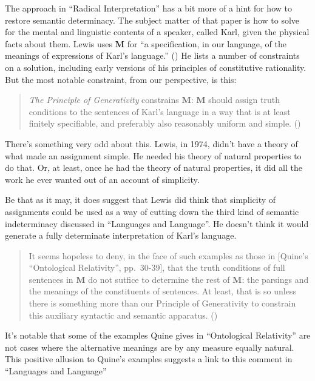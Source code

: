 \documentclass[
  11pt,
  letterpaper,
  DIV=11,
  numbers=noendperiod,
  twoside]{scrartcl}
\begin{document}
The approach in ``Radical Interpretation'' has a bit more of a hint for
how to restore semantic determinacy. The subject matter of that paper is
how to solve for the mental and linguistic contents of a speaker, called
Karl, given the physical facts about them. Lewis uses \textbf{M} for ``a
specification, in our language, of the meanings of expressions of Karl's
language.'' () He lists a
number of constraints on a solution, including early versions of his
principles of constitutive rationality. But the most notable constraint,
from our perspective, is this:

\begin{quote}
\emph{The Principle of Generativity} constrains \textbf{M}: \textbf{M}
should assign truth conditions to the sentences of Karl's language in a
way that is at least finitely specifiable, and preferably also
reasonably uniform and simple. ()
\end{quote}

There's something very odd about this. Lewis, in 1974, didn't have a
theory of what made an assignment simple. He needed his theory of
natural properties to do that. Or, at least, once he had the theory of
natural properties, it did all the work he ever wanted out of an account
of simplicity.

Be that as it may, it does suggest that Lewis did think that simplicity
of assignments could be used as a way of cutting down the third kind of
semantic indeterminacy discussed in ``Languages and Language''. He
doesn't think it would generate a fully determinate interpretation of
Karl's language.

\begin{quote}
It seems hopeless to deny, in the face of such examples as those in
{[}Quine's ``Ontological Relativity'', pp.~30-39{]}, that the truth
conditions of full sentences in \textbf{M} do not sutfice to determine
the rest of \textbf{M}: the parsings and the meanings of the
constituents of sentences. At least, that is so unless there is
something more than our Principle of Generativity to constrain this
auxiliary syntactic and semantic apparatus.
()
\end{quote}

It's notable that some of the examples Quine gives in ``Ontological
Relativity'' are not cases where the alternative meanings are by any
measure equally natural. This positive allusion to Quine's examples
suggests a link to this comment in ``Languages and Language''
\end{document}
